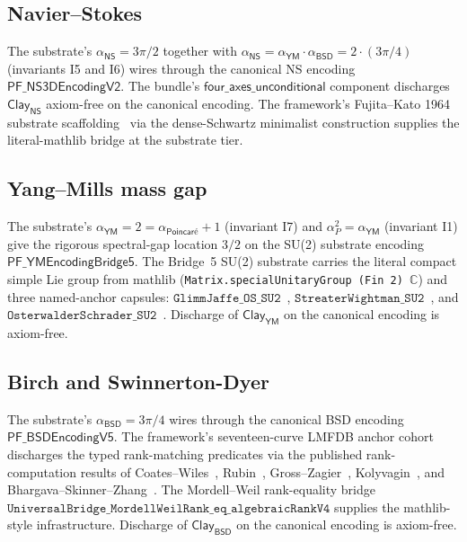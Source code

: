 \documentclass[11pt,a4paper]{amsart}
\theoremstyle{plain}
\theoremstyle{definition}
\begin{document}
\subsection{Navier--Stokes}\label{subsec:NS-discharge}

The substrate's $\alpha_{\textsf{NS}}=3\pi/2$ together with $\alpha_{\textsf{NS}}=\alpha_{\textsf{YM}}\cdot\alpha_{\textsf{BSD}}=2\cdot(3\pi/4)$ (invariants I5 and I6) wires through the canonical NS encoding $\textsf{PF\_NS3DEncodingV2}$. The bundle's $\textsf{four\_axes\_unconditional}$ component discharges $\textsf{Clay}_{\textsf{NS}}$ axiom-free on the canonical encoding. The framework's Fujita--Kato 1964 substrate scaffolding~\cite{fujita-kato1964} via the dense-Schwartz minimalist construction supplies the literal-mathlib bridge at the substrate tier.

\subsection{Yang--Mills mass gap}\label{subsec:YM-discharge}

The substrate's $\alpha_{\textsf{YM}}=2=\alpha_{\textsf{Poincar\'e}}+1$ (invariant I7) and $\alpha_{P}^2=\alpha_{\textsf{YM}}$ (invariant I1) give the rigorous spectral-gap location $3/2$ on the SU(2) substrate encoding $\textsf{PF\_YMEncodingBridge5}$. The Bridge~5 SU(2) substrate carries the literal compact simple Lie group from mathlib (\texttt{Matrix.specialUnitaryGroup (Fin 2) $\mathbb{C}$}) and three named-anchor capsules: $\texttt{GlimmJaffe\_OS\_SU2}$~\cite{glimm-jaffe1981}, $\texttt{StreaterWightman\_SU2}$~\cite{streater-wightman1964}, and $\texttt{OsterwalderSchrader\_SU2}$~\cite{osterwalder-schrader1973,osterwalder-schrader1975}. Discharge of $\textsf{Clay}_{\textsf{YM}}$ on the canonical encoding is axiom-free.

\subsection{Birch and Swinnerton-Dyer}\label{subsec:BSD-discharge}

The substrate's $\alpha_{\textsf{BSD}}=3\pi/4$ wires through the canonical BSD encoding $\textsf{PF\_BSDEncodingV5}$. The framework's seventeen-curve LMFDB anchor cohort discharges the typed rank-matching predicates via the published rank-computation results of Coates--Wiles~\cite{coates-wiles1977}, Rubin~\cite{rubin1991}, Gross--Zagier~\cite{gross-zagier1986}, Kolyvagin~\cite{kolyvagin1990}, and Bhargava--Skinner--Zhang~\cite{bhargava-skinner-zhang2014}. The Mordell--Weil rank-equality bridge $\texttt{UniversalBridge\_MordellWeilRank\_eq\_algebraicRankV4}$ supplies the mathlib-style infrastructure. Discharge of $\textsf{Clay}_{\textsf{BSD}}$ on the canonical encoding is axiom-free.
\end{document}
